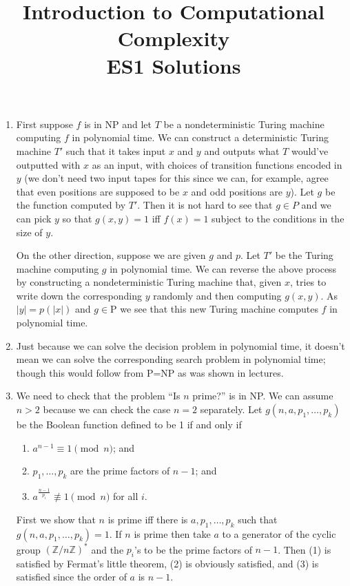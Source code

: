 \documentclass{article}
\theoremstyle{definition}
\theoremstyle{plain}
\theoremstyle{definition}
\begin{document}
\title{Introduction to Computational Complexity\\ ES1 Solutions}
\date{}
\maketitle
\begin{enumerate}
	\item First suppose $f$ is in NP and let $T$ be a nondeterministic Turing machine computing $f$ in polynomial time. We can construct a deterministic Turing machine $T'$ such that it takes input $x$ and $y$ and outputs what $T$ would've outputted with $x$ as an input, with choices of transition functions encoded in $y$ (we don't need two input tapes for this since we can, for example, agree that even positions are supposed to be $x$ and odd positions are $y$). Let $g$ be the function computed by $T'$. Then it is not hard to see that $g\in P$ and we can pick $y$ so that $g(x,y) = 1$ iff $f(x) = 1$ subject to the conditions in the size of $y$.
	
	On the other direction, suppose we are given $g$ and $p$. Let $T'$ be the Turing machine computing $g$ in polynomial time. We can reverse the above process by constructing a nondeterministic Turing machine that, given $x$, tries to write down the corresponding $y$ randomly and then computing $g(x,y)$. As $|y| = p(|x|)$ and $g\in \text{P}$ we see that this new Turing machine computes $f$ in polynomial time.
	
	\item Just because we can solve the decision problem in polynomial time, it doesn't mean we can solve the corresponding search problem in polynomial time; though this would follow from P=NP as was shown in lectures.
	\item We need to check that the problem ``Is $n$ prime?'' is in NP. We can assume $n>2$ because we can check the case $n=2$ separately. Let $g(n,a, p_1,\ldots,p_k)$ be the Boolean function defined to be 1 if and only if
	\begin{enumerate}[label=(\arabic*)]
		\item $a^{n-1} \equiv 1 \pmod{n}$; and
		\item $p_1,\ldots, p_k$ are the prime factors of $n-1$; and 
		\item $a^{\frac{n-1}{p_i}} \not\equiv 1 \pmod{n}$ for all $i$.
	\end{enumerate}
	First we show that $n$ is prime iff there is $a,p_1,\ldots,p_k$ such that $g(n,a, p_1,\ldots,p_k) = 1$. If $n$ is prime then take $a$ to a generator of the cyclic group $(\mathbb{Z}/n\mathbb{Z})^*$ and the $p_i$'s to be the prime factors of $n-1$. Then (1) is satisfied by Fermat's little theorem, (2) is obviously satisfied, and (3) is satisfied since the order of $a$ is $n-1$.
	

\end{enumerate}
\end{document}
